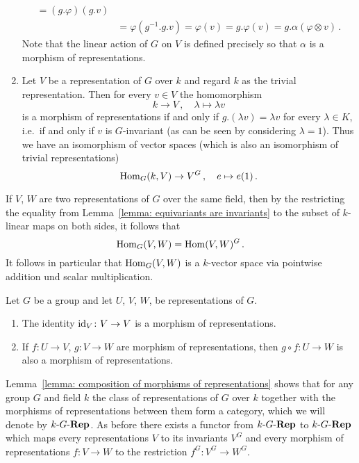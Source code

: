 \begin{example}
\begin{enumerate}
\begin{align*}
         =  (g.\varphi)(g.v)
        \\
        &=  \varphi(g^{-1}.g.v)
         =  \varphi(v)
         =  g.\varphi(v)
         =  g.\alpha(\varphi \otimes v) \,.
      \end{align*}
      Note that the linear action of $G$ on $V$ is defined precisely so that $\alpha$ is a morphism of representations.
    \item
      Let $V$ be a representation of $G$ over $k$ and regard $k$ as the trivial representation.
      Then for every $v \in V$ the homomorphism
      \[
                k
        \to     V \,,
        \quad   \lambda
        \mapsto \lambda v
      \]
      is a morphism of representations if and only if $g.(\lambda v) = \lambda v$ for every $\lambda \in K$, i.e.\ if and only if $v$ is $G$-invariant (as can be seen by considering $\lambda = 1$).
      Thus we have an isomorphism of vector spaces (which is also an isomorphism of trivial representations)
      \[
                \operatorname{Hom}_G(k,V)
        \to     V^G \,,
        \quad   e
        \mapsto e(1) \,.
      \]
  \end{enumerate}
\end{example}


\begin{remark}
  If $V$, $W$ are two representations of $G$ over the same field, then by the restricting the equality from Lemma~\ref{lemma: equivariants are invariants} to the subset of $k$-linear maps on both sides, it follows that
  \[
      \operatorname{Hom}_G(V,W)
    = \operatorname{Hom}(V,W)^G \,.
  \]
  It follows in particular that $\operatorname{Hom}_G(V,W)$ is a $k$-vector space via pointwise addition und scalar multiplication.
\end{remark}


\begin{lemma}
\label{lemma: composition of morphisms of representations}
  Let $G$ be a group and let $U$, $V$, $W$, be representations of $G$.
  \begin{enumerate}
    \item
      The identity $\operatorname{id}_V \colon V \to V$ is a morphism of representations.
    \item
      If $f \colon U \to V$, $g \colon V \to W$ are morphism of representations, then $g \circ f \colon U \to W$ is also a morphism of representations.
  \end{enumerate}
\end{lemma}


\begin{fluff}
  Lemma~\ref{lemma: composition of morphisms of representations} shows that for any group $G$ and field $k$ the class of representations of $G$ over $k$ together with the morphisms of representations between them form a category, which we will denote by $k\text{-}G\text{-}\mathbf{Rep}$.
  As before there exists a functor from $k\text{-}G\text{-}\mathbf{Rep}$ to $k\text{-}G\text{-}\mathbf{Rep}$ which maps every representations $V$ to its invariants $V^G$ and every morphism of representations $f \colon V \to W$ to the restriction $f^G \colon V^G \to W^G$.
\end{fluff}


